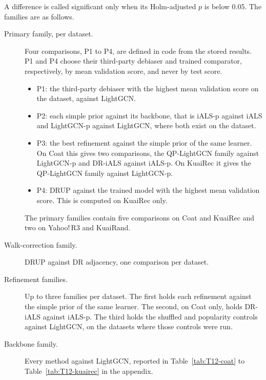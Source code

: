 A difference is called significant only when its Holm-adjusted $p$ is below 0.05. The families are as follows.
\begin{description}
\item[Primary family, per dataset.] Four comparisons, P1 to P4, are defined in code from the stored
results. P1 and P4 choose their third-party debiaser and trained comparator, respectively, by mean
validation score, and never by test score.
  \begin{itemize}
  \item P1: the third-party debiaser with the highest mean validation score on the dataset, against LightGCN.
  \item P2: each simple prior against its backbone, that is iALS-p against iALS and LightGCN-p against
  LightGCN, where both exist on the dataset.
  \item P3: the best refinement against the simple prior of the same learner. On Coat this gives two
  comparisons, the QP-LightGCN family against LightGCN-p and DR-iALS against iALS-p. On KuaiRec it gives the
  QP-LightGCN family against LightGCN-p.
  \item P4: DRUP against the trained model with the highest mean validation score. This is computed on
  KuaiRec only.
  \end{itemize}
  The primary families contain five comparisons on Coat and KuaiRec and two on Yahoo!\,R3 and KuaiRand.
\item[Walk-correction family.] DRUP against DR adjacency, one comparison per dataset.
\item[Refinement families.] Up to three families per dataset. The first holds each refinement against the simple
prior of the same learner. The second, on Coat only, holds DR-iALS against iALS-p. The third holds the shuffled
and popularity controls against LightGCN, on the datasets where those controls were run.
\item[Backbone family.] Every method against LightGCN, reported in Table~\ref{tab:T12-coat} to
Table~\ref{tab:T12-kuairec} in the appendix.
\end{description}

